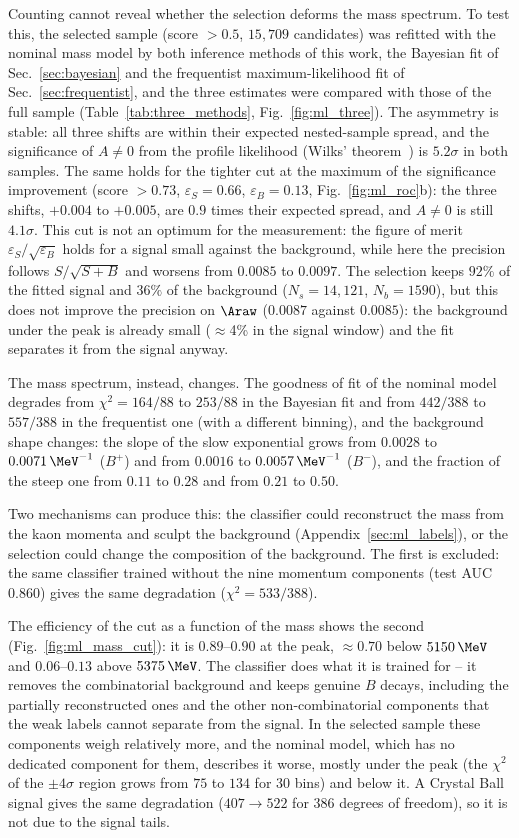 Counting cannot reveal whether the selection deforms the mass spectrum. To test this, the selected sample (score $>0.5$, $15{,}709$ candidates) was refitted with the nominal mass model by both inference methods of this work, the Bayesian fit of Sec.~\ref{sec:bayesian} and the frequentist maximum-likelihood fit of Sec.~\ref{sec:frequentist}, and the three estimates were compared with those of the full sample (Table~\ref{tab:three_methods}, Fig.~\ref{fig:ml_three}). The asymmetry is stable: all three shifts are within their expected nested-sample spread, and the significance of $A\neq0$ from the profile likelihood (Wilks' theorem~\cite{wilks}) is $5.2\sigma$ in both samples. The same holds for the tighter cut at the maximum of the significance improvement (score $>0.73$, $\varepsilon_S=0.66$, $\varepsilon_B=0.13$, Fig.~\ref{fig:ml_roc}b): the three shifts, $+0.004$ to $+0.005$, are $0.9$ times their expected spread, and $A\neq0$ is still $4.1\sigma$. This cut is not an optimum for the measurement: the figure of merit $\varepsilon_S/\sqrt{\varepsilon_B}$ holds for a signal small against the background, while here the precision follows $S/\sqrt{S+B}$ and worsens from $0.0085$ to $0.0097$. The selection keeps $92\%$ of the fitted signal and $36\%$ of the background ($N_s=14{,}121$, $N_b=1590$), but this does not improve the precision on $\Araw$ ($0.0087$ against $0.0085$): the background under the peak is already small ($\approx$4\% in the signal window) and the fit separates it from the signal anyway.

The mass spectrum, instead, changes. The goodness of fit of the nominal model degrades from $\chi^2=164/88$ to $253/88$ in the Bayesian fit and from $442/388$ to $557/388$ in the frequentist one (with a different binning), and the background shape changes: the slope of the slow exponential grows from $0.0028$ to $0.0071\,\MeV^{-1}$ ($B^+$) and from $0.0016$ to $0.0057\,\MeV^{-1}$ ($B^-$), and the fraction of the steep one from $0.11$ to $0.28$ and from $0.21$ to $0.50$.

Two mechanisms can produce this: the classifier could reconstruct the mass from the kaon momenta and sculpt the background (Appendix~\ref{sec:ml_labels}), or the selection could change the composition of the background. The first is excluded: the same classifier trained without the nine momentum components (test AUC $0.860$) gives the same degradation ($\chi^2=533/388$).

The efficiency of the cut as a function of the mass shows the second (Fig.~\ref{fig:ml_mass_cut}): it is $0.89$--$0.90$ at the peak, $\approx0.70$ below $5150\,\MeV$ and $0.06$--$0.13$ above $5375\,\MeV$. The classifier does what it is trained for -- it removes the combinatorial background and keeps genuine $B$ decays, including the partially reconstructed ones and the other non-combinatorial components that the weak labels cannot separate from the signal. In the selected sample these components weigh relatively more, and the nominal model, which has no dedicated component for them, describes it worse, mostly under the peak (the $\chi^2$ of the $\pm4\sigma$ region grows from $75$ to $134$ for 30 bins) and below it. A Crystal Ball signal gives the same degradation ($407\to522$ for 386 degrees of freedom), so it is not due to the signal tails.

